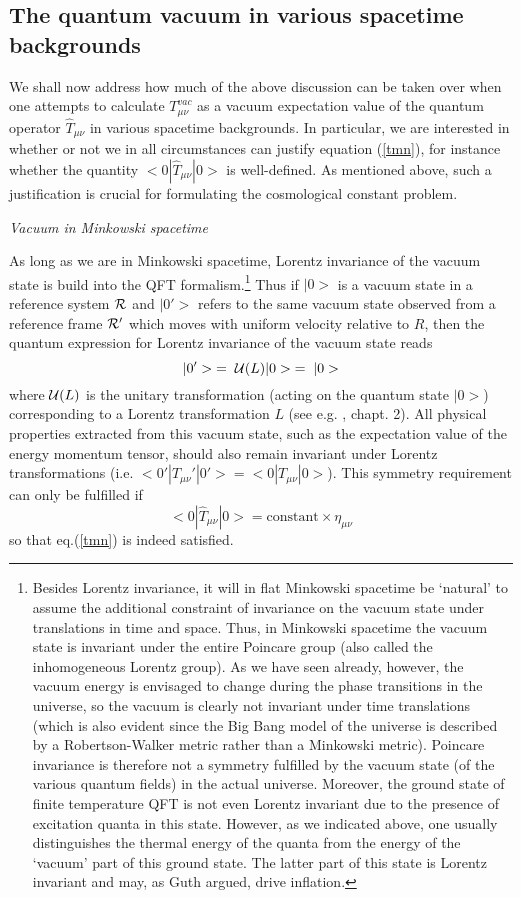 \documentclass[12pt]{article}
\def\ss{\subsection}
\begin{document}
\ss{The quantum vacuum in various spacetime backgrounds}

We shall now address how much of the above discussion can be taken
over when one attempts to calculate $T^{vac}_{\mu\nu}$ as a vacuum
expectation value of the quantum operator $\hat{T}_{\mu \nu}$ in
various spacetime backgrounds. In particular, we are interested in
whether or not we in all circumstances can justify equation
(\ref{tmn}), for instance whether the quantity $<0|\hat{T}_{\mu\nu}|0>$ is
well-defined. As mentioned above, such a justification is crucial
for formulating the cosmological constant problem.

{\em Vacuum in Minkowski spacetime}

As long as we are in Minkowski spacetime, Lorentz invariance of
the vacuum state is build into the QFT formalism.\footnote{Besides
Lorentz invariance, it will in flat Minkowski spacetime be
`natural' to assume the additional constraint of invariance on the
vacuum state under translations in time and space. Thus, in
Minkowski spacetime the vacuum state is invariant under the entire
Poincare group (also called the inhomogeneous Lorentz group). As
we have seen already, however, the vacuum energy is envisaged to
change during the phase transitions in the universe, so the vacuum
is clearly not invariant under time translations (which is also
evident since the Big Bang model of the universe is described by a
Robertson-Walker metric rather than a Minkowski metric). Poincare
invariance is therefore not a symmetry fulfilled by the vacuum
state (of the various quantum fields) in the actual universe.
Moreover, the ground state of finite temperature QFT is not even
Lorentz invariant due to the presence of excitation quanta in this
state. However, as we indicated above, one usually distinguishes
the thermal energy of the quanta from the energy of the `vacuum'
part of this ground state. The latter part of this state is
Lorentz invariant and may, as Guth argued, drive inflation.} Thus
if $|0>$ is a vacuum state in a reference system $\cal{R}$ and
$|0'>$ refers to the same vacuum state observed from a reference
frame $\cal{R'}$ which moves with uniform velocity relative to
$R$, then the quantum expression for Lorentz invariance of the
vacuum state reads
$$|0'>\; =\; {\cal{U}}(L)|0>\;=\;|0>$$
where ${\cal{U}}(L)$ is the unitary transformation (acting on
the quantum state $|0>$) corresponding to a Lorentz transformation $L$
(see e.g. \cite{weinberg96}, chapt. 2).
All physical properties extracted from this vacuum state, such as the 
expectation value of the energy momentum tensor,
should also remain invariant under Lorentz transformations 
(i.e. $<0'|T_{\mu\nu}'|0'> = <0|T_{\mu\nu}|0>$). This symmetry
requirement can only be fulfilled if
$$<0|\hat{T}_{\mu \nu}|0>= \mbox{constant} \times \eta_{\mu\nu}$$
so that eq.(\ref{tmn}) is indeed satisfied.  
\end{document}

